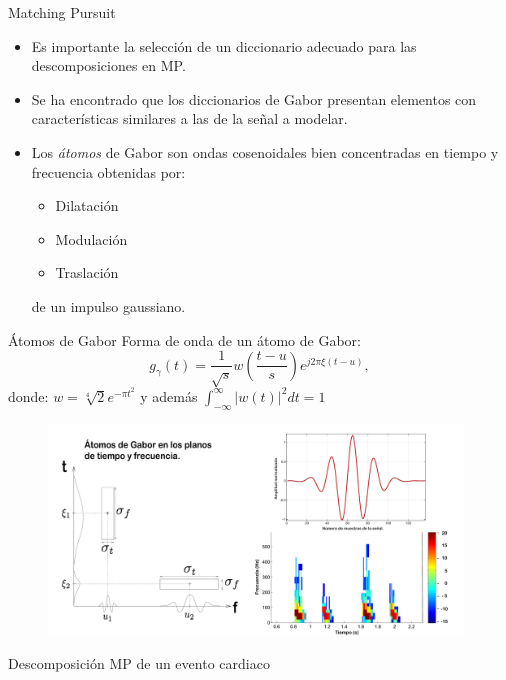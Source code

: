 \documentclass[xcolor=table]{beamer}
\begin{document}
\begin{frame}{Matching Pursuit}
	\begin{itemize}
		\item<2-> Es importante la selecci\'on de un diccionario adecuado para las descomposiciones en MP.
		\item<3-> Se ha encontrado que los diccionarios de Gabor presentan elementos con caracter\'isticas similares a las 			  de la se\~nal a modelar.
		\item<4-> Los \emph{\'atomos} de Gabor son ondas cosenoidales bien concentradas en tiempo y frecuencia obtenidas 			  por:
				\begin{itemize}
					\item<5-> Dilataci\'on 
					\item<6-> Modulaci\'on
					\item<7-> Traslaci\'on
				\end{itemize}
				de un impulso gaussiano.
	\end{itemize}
\end{frame}

\begin{frame}{\'Atomos de Gabor}
				Forma de onda de un \'atomo de Gabor:
				$$ g_\gamma(t)=\frac{1}{\sqrt{s}}w\left(\frac{t-u}{s}\right)e^{j2\pi\xi(t-u)},$$
				donde: $w=\sqrt[4]{2}e^{-\pi t^2}$ y adem\'as $\int_{-\infty}^{\infty}{|w(t)|^2}dt=1$
	\begin{figure}
	\centering
	\includegraphics[width=0.98\textwidth]{gaborAtoms.pdf}
	\end{figure}
\end{frame}

\begin{frame}{Descomposici\'on MP de un evento cardiaco}
\begin{center}
\end{center}
\end{frame}
\end{document}
